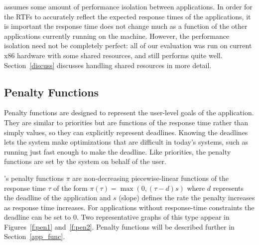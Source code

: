 \pacora assumes some amount of performance isolation between
applications.  In order for the RTFs to accurately reflect the
expected response times of the applications, it is important the
response time does not change much as a function of the other
applications currently running on the machine.  However, the
performance isolation need not be completely perfect: all of our
evaluation was run on current x86 hardware with some shared resources,
and \pacora still performs quite well. Section~\ref{discuss} discusses
handling shared resources in more detail.

\subsection{Penalty Functions}
Penalty functions are designed to represent the user-level goals of
the application. They are similar to priorities but are functions of
the response time rather than simply values, so they can explicitly
represent deadlines.  Knowing the deadlines lets the system make
optimizations that are difficult in today's systems, such as running
just fast enough to make the deadline. Like priorities, the penalty
functions are set by the system on behalf of the user.

\pacora's penalty functions $\pi$ are non-decreasing piecewise-linear
functions of the response time $\tau$ of the form $\pi(\tau) = \max(0, (\tau - d)s)$
where $d$ represents the deadline of the application and $s$ (slope)
defines the rate the penalty increases as response time increases. For
applications without response-time constraints the deadline can be set
to $0$. Two representative graphs of this type appear in
Figures~\ref{f:pen1} and~\ref{f:pen2}.
Penalty functions will be described further in Section~\ref{app_func}.


